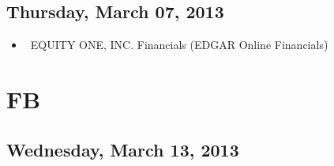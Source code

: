 \documentclass[11pt,asymmetric]{article}
\begin{document}
\subsection*{Thursday, March 07, 2013}
\begin{itemize}
\item\ EQUITY ONE, INC. Financials (EDGAR Online Financials)
\end{itemize}

\section*{FB}

\subsection*{Wednesday, March 13, 2013}
\end{document}
